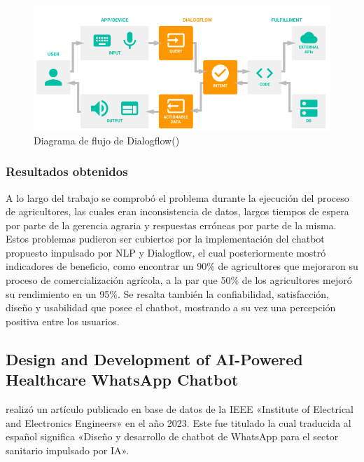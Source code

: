 \begin{figure}[h]
	\begin{center}
		\includegraphics[width=1\textwidth]{2/figures/3_1.png}
		\caption{Diagrama de flujo de Dialogflow(\cite{ts_CDRNRMPC})}
	\end{center}
\end{figure}

\subsubsection{Resultados obtenidos}

A lo largo del trabajo se comprobó el problema durante la ejecución del proceso de agricultores, las cuales eran inconsistencia de datos, largos tiempos de espera por parte de la gerencia agraria y respuestas erróneas por parte de la misma. Estos problemas pudieron ser cubiertos por la implementación del chatbot propuesto impulsado por NLP y Dialogflow, el cual posteriormente mostró indicadores de beneficio, como encontrar un 90\% de agricultores que mejoraron su proceso de comercialización agrícola, a la par que 50\% de los agricultores mejoró su rendimiento en un 95\%.
Se resalta también la confiabilidad, satisfacción, diseño y usabilidad que posee el chatbot, mostrando a su vez una percepción positiva entre los usuarios.


\subsection{Design and Development of AI-Powered Healthcare 
WhatsApp Chatbot \citep*{pr_DDAIHWC}}

\citeauthor{pr_DDAIHWC} realizó un artículo publicado en base de datos de la IEEE «Institute of Electrical and Electronics Engineers» en el año 2023.
Este fue titulado  la cual traducida al español significa «Diseño y desarrollo de chatbot de WhatsApp para el sector sanitario impulsado por IA». 

